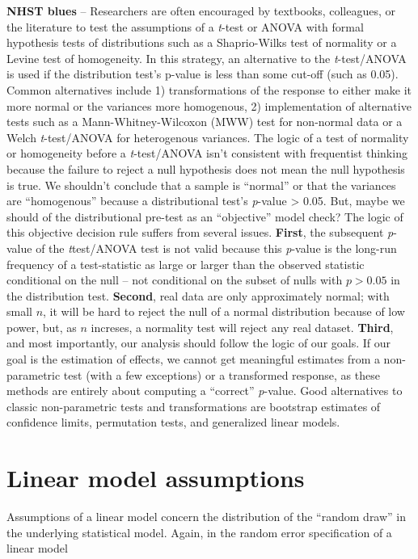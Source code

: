 \documentclass[]{book}
\begin{document}
\textbf{NHST blues} -- Researchers are often encouraged by textbooks,
colleagues, or the literature to test the assumptions of a \emph{t}-test
or ANOVA with formal hypothesis tests of distributions such as a
Shaprio-Wilks test of normality or a Levine test of homogeneity. In this
strategy, an alternative to the \emph{t}-test/ANOVA is used if the
distribution test's p-value is less than some cut-off (such as 0.05).
Common alternatives include 1) transformations of the response to either
make it more normal or the variances more homogenous, 2) implementation
of alternative tests such as a Mann-Whitney-Wilcoxon (MWW) test for
non-normal data or a Welch \emph{t}-test/ANOVA for heterogenous
variances. The logic of a test of normality or homogeneity before a
\emph{t}-test/ANOVA isn't consistent with frequentist thinking because
the failure to reject a null hypothesis does not mean the null
hypothesis is true. We shouldn't conclude that a sample is ``normal'' or
that the variances are ``homogenous'' because a distributional test's
\emph{p}-value \textgreater{} 0.05. But, maybe we should of the
distributional pre-test as an ``objective'' model check? The logic of
this objective decision rule suffers from several issues.
\textbf{First}, the subsequent \emph{p}-value of the \emph{t}test/ANOVA
test is not valid because this \emph{p}-value is the long-run frequency
of a test-statistic as large or larger than the observed statistic
conditional on the null -- not conditional on the subset of nulls with
\(p > 0.05\) in the distribution test. \textbf{Second}, real data are
only approximately normal; with small \(n\), it will be hard to reject
the null of a normal distribution because of low power, but, as \(n\)
increses, a normality test will reject any real dataset. \textbf{Third},
and most importantly, our analysis should follow the logic of our goals.
If our goal is the estimation of effects, we cannot get meaningful
estimates from a non-parametric test (with a few exceptions) or a
transformed response, as these methods are entirely about computing a
``correct'' \emph{p}-value. Good alternatives to classic non-parametric
tests and transformations are bootstrap estimates of confidence limits,
permutation tests, and generalized linear models.

\section{Linear model assumptions}\label{linear-model-assumptions}

Assumptions of a linear model concern the distribution of the ``random
draw'' in the underlying statistical model. Again, in the random error
specification of a linear model
\end{document}

